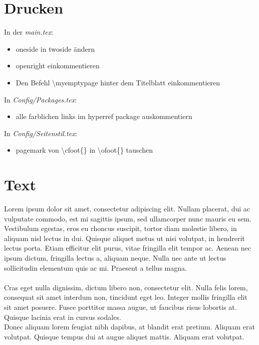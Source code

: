 \section{Drucken}
\label{sec:Drucken}
%
In der \textit{main.tex}:
\begin{itemize}
    \item oneside in twoside ändern
    \item openright einkommentieren
    \item  Den Befehl \textbackslash myemptypage hinter dem Titelblatt einkommentieren
\end{itemize}
%
In \textit{Config/Packages.tex}: 
\begin{itemize}
    \item alle farblichen links im hyperref package auskommentiern
\end{itemize}
%
In \textit{Config/Seitenstil.tex}: 
\begin{itemize}
    \item  pagemark von \textbackslash cfoot\{\} in \textbackslash ofoot\{\} tauschen
\end{itemize}
%
%
\section{Text}
\label{sec:Text}
%
Lorem ipsum dolor sit amet, consectetur adipiscing elit. Nullam placerat, dui ac vulputate commodo, est mi sagittis ipsum, sed ullamcorper nunc mauris eu sem. Vestibulum egestas, eros eu rhoncus suscipit, tortor diam molestie libero, in aliquam nisl lectus in dui. Quisque aliquet metus ut nisi volutpat, in hendrerit lectus porta. Etiam efficitur elit purus, vitae fringilla elit tempor ac. Aenean nec ipsum dictum, fringilla lectus a, aliquam neque. Nulla nec ante ut lectus sollicitudin elementum quis ac mi. Praesent a tellus magna.\\\\
%
Cras eget nulla dignissim, dictum libero non, consectetur elit. Nulla felis lorem, consequat sit amet interdum non, tincidunt eget leo. Integer mollis fringilla elit sit amet posuere. Fusce porttitor massa augue, ut faucibus risus lobortis at. Quisque lacinia erat in cursus sodales. \\
Donec aliquam lorem feugiat nibh dapibus, at blandit erat pretium. Aliquam erat volutpat. Quisque tempus dui at augue aliquet mattis. Aliquam erat volutpat.
%
%
